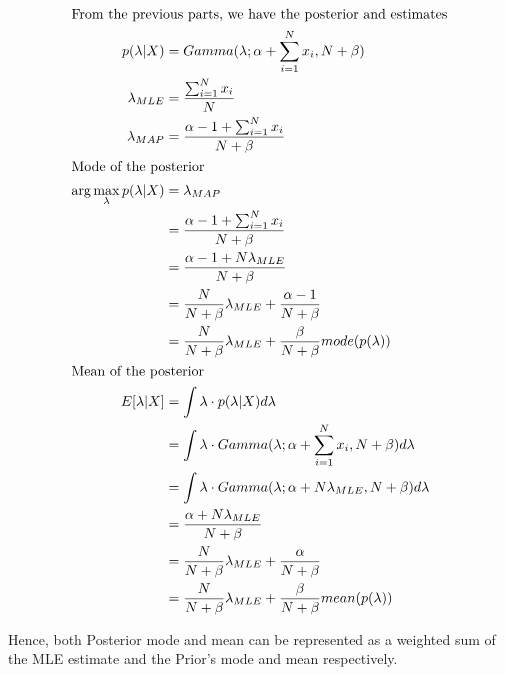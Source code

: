 \documentclass{article}
\begin{document}
\begin{addmargin}{1.5em}
\begin{addmargin}{1.5em}
        \begin{align*}
            \shortintertext{From the previous parts, we have the posterior and estimates}
            p(\lambda | X)                    &= Gamma(\lambda; \alpha + \sum_{i = 1}^{N} x_i, N + \beta) \\
            \lambda_{MLE}                     &= \frac{\sum_{i = 1}^{N} x_i}{N} \\
            \lambda_{MAP}                     &= \frac{\alpha - 1 + \sum_{i = 1}^{N} x_i}{N + \beta} \\
            \shortintertext{Mode of the posterior}
            \arg\max_{\lambda} p(\lambda | X) &= \lambda_{MAP} \\
                                              &= \frac{\alpha - 1 + \sum_{i = 1}^{N} x_i}{N + \beta} \\
                                              &= \frac{\alpha - 1 + N\lambda_{MLE}}{N + \beta} \\
                                              &= \frac{N}{N + \beta}\lambda_{MLE} + \frac{\alpha - 1}{N 
                                              + \beta} \\
                                              &= \frac{N}{N + \beta}\lambda_{MLE} + \frac{\beta}{N + \beta}mode(p(\lambda))\\
            \shortintertext{Mean of the posterior}
            E[\lambda | X]                    &= \int \lambda \cdot p(\lambda | X) d\lambda \\
                                              &= \int \lambda \cdot Gamma(\lambda; \alpha + \sum_{i = 1}^{N} x_i, N + \beta) d\lambda \\
                                              &= \int \lambda \cdot Gamma(\lambda; \alpha + N\lambda_{MLE}, N + \beta) d\lambda \\
                                              &= \frac{\alpha + N\lambda_{MLE}}{N + \beta} \\
                                              &= \frac{N}{N + \beta}\lambda_{MLE} + \frac{\alpha}{N 
                                              + \beta} \\
                                              &= \frac{N}{N + \beta}\lambda_{MLE} + \frac{\beta}{N + \beta}mean(p(\lambda))
        \end{align*}
        
    \end{addmargin}
    
    Hence, both Posterior mode and mean can be represented as a weighted sum of the MLE estimate and the Prior's mode and mean respectively.
    
\end{addmargin}
\end{document}
